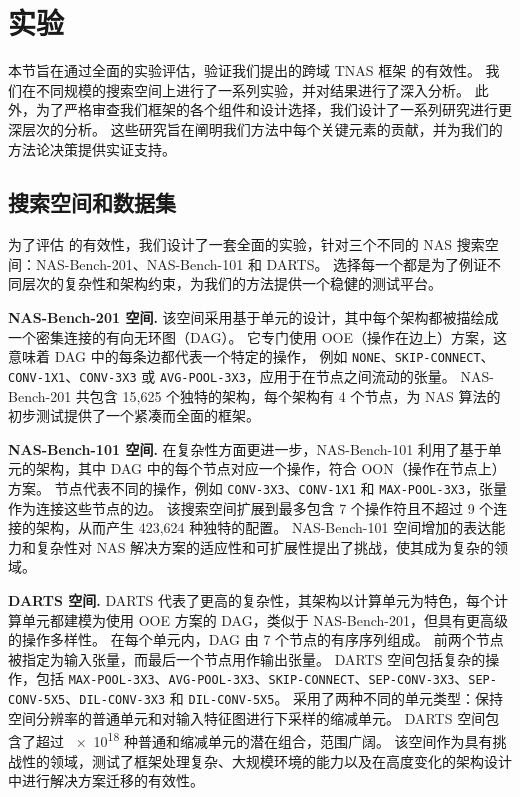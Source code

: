 \documentclass[../main_zh.tex]{subfiles}
\begin{document}
\section{实验}\label{sec:experiment}

本节旨在通过全面的实验评估，验证我们提出的跨域 TNAS 框架 \OUR{} 的有效性。
我们在不同规模的搜索空间上进行了一系列实验，并对结果进行了深入分析。
此外，为了严格审查我们框架的各个组件和设计选择，我们设计了一系列研究进行更深层次的分析。
这些研究旨在阐明我们方法中每个关键元素的贡献，并为我们的方法论决策提供实证支持。

\subsection{搜索空间和数据集}

为了评估 \OUR{} 的有效性，我们设计了一套全面的实验，针对三个不同的 NAS 搜索空间：NAS-Bench-201、NAS-Bench-101 和 DARTS。
选择每一个都是为了例证不同层次的复杂性和架构约束，为我们的方法提供一个稳健的测试平台。

\textbf{NAS-Bench-201 空间.}\cite{DBLP:journals/pami/DongLMG22}\quad
该空间采用基于单元的设计，其中每个架构都被描绘成一个密集连接的有向无环图（DAG）。
它专门使用 OOE（操作在边上）方案，这意味着 DAG 中的每条边都代表一个特定的操作，
例如 \texttt{NONE}、\texttt{SKIP-CONNECT}、\texttt{CONV-1X1}、\texttt{CONV-3X3}
或 \texttt{AVG-POOL-3X3}，应用于在节点之间流动的张量。
NAS-Bench-201 共包含 15,625 个独特的架构，每个架构有 4 个节点，为 NAS 算法的初步测试提供了一个紧凑而全面的框架。

\textbf{NAS-Bench-101 空间.}\cite{DBLP:conf/icml/YingKCR0H19}\quad
在复杂性方面更进一步，NAS-Bench-101 利用了基于单元的架构，其中 DAG 中的每个节点对应一个操作，符合 OON（操作在节点上）方案。
节点代表不同的操作，例如 \texttt{CONV-3X3}、\texttt{CONV-1X1} 和 \texttt{MAX-POOL-3X3}，张量作为连接这些节点的边。
该搜索空间扩展到最多包含 7 个操作符且不超过 9 个连接的架构，从而产生 423,624 种独特的配置。
NAS-Bench-101 空间增加的表达能力和复杂性对 NAS 解决方案的适应性和可扩展性提出了挑战，使其成为复杂的领域。

\textbf{DARTS 空间.}\cite{DBLP:conf/iclr/LiuSY19}\quad
DARTS 代表了更高的复杂性，其架构以计算单元为特色，每个计算单元都建模为使用 OOE 方案的 DAG，类似于 NAS-Bench-201，但具有更高级的操作多样性。
在每个单元内，DAG 由 7 个节点的有序序列组成。
前两个节点被指定为输入张量，而最后一个节点用作输出张量。
DARTS 空间包括复杂的操作，包括 \texttt{MAX-POOL-3X3}、\texttt{AVG-POOL-3X3}、\texttt{SKIP-CONNECT}、\texttt{SEP-CONV-3X3}、\texttt{SEP-CONV-5X5}、\texttt{DIL-CONV-3X3} 和 \texttt{DIL-CONV-5X5}。
采用了两种不同的单元类型：保持空间分辨率的普通单元和对输入特征图进行下采样的缩减单元。
DARTS 空间包含了超过 \num{e18} 种普通和缩减单元的潜在组合，范围广阔。
该空间作为具有挑战性的领域，测试了框架处理复杂、大规模环境的能力以及在高度变化的架构设计中进行解决方案迁移的有效性。
\end{document}

